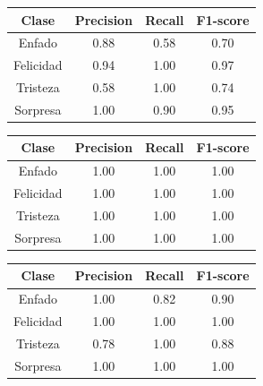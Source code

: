 \begin{table}[h]
\begin{minipage}{0.48\linewidth}
\centering
\begin{adjustbox}{max width=\textwidth}
\begin{tabular}{|c|c|c|c|}
\hline
\textbf{Clase} & \textbf{Precision} & \textbf{Recall} & \textbf{F1-score}\\
\hline
     Enfado & 0.88 & 0.58 & 0.70\\
     Felicidad & 0.94 & 1.00 & 0.97\\
     Tristeza & 0.58 & 1.00 & 0.74\\
     Sorpresa & 1.00 & 0.90 & 0.95\\
\hline
\end{tabular}
\end{adjustbox}
\vspace{0.5cm}

\begin{adjustbox}{max width=\textwidth}
\begin{tabular}{|c|c|c|c|}
\hline
\textbf{Clase} & \textbf{Precision} & \textbf{Recall} & \textbf{F1-score}\\
\hline
     Enfado & 1.00 & 1.00 & 1.00\\
     Felicidad & 1.00 & 1.00 & 1.00\\
     Tristeza & 1.00 & 1.00 & 1.00\\
     Sorpresa & 1.00 & 1.00 & 1.00\\
\hline
\end{tabular}
\end{adjustbox}
\end{minipage}\hfill
\begin{minipage}{0.48\linewidth}
\centering
\begin{adjustbox}{max width=\textwidth}
\begin{tabular}{|c|c|c|c|}
\hline
\textbf{Clase} & \textbf{Precision} & \textbf{Recall} & \textbf{F1-score}\\
\hline
     Enfado & 1.00 & 0.82 & 0.90\\
     Felicidad & 1.00 & 1.00 & 1.00\\
     Tristeza & 0.78 & 1.00 & 0.88\\
     Sorpresa & 1.00 & 1.00 & 1.00\\
\hline
\end{tabular}
\end{adjustbox}
\vspace{0.5cm}


\end{minipage}
\end{table}
